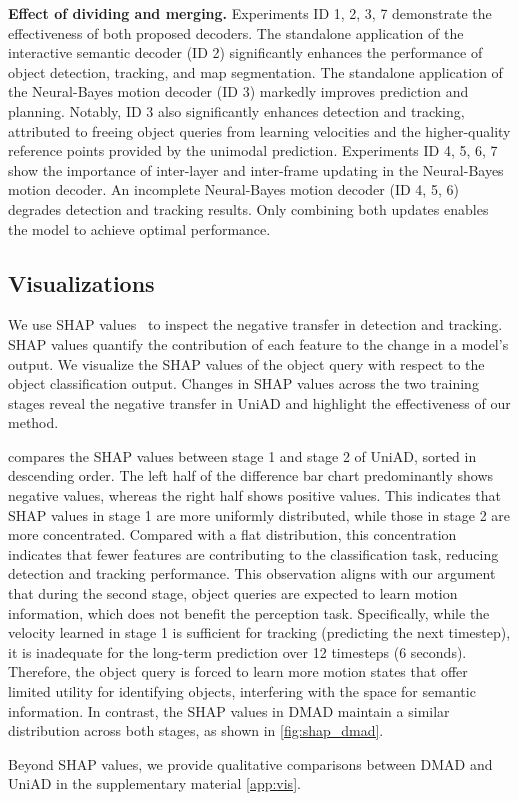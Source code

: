 \textbf{Effect of dividing and merging.} Experiments ID 1, 2, 3, 7 demonstrate the effectiveness of both proposed decoders. The standalone application of the interactive semantic decoder (ID 2) significantly enhances the performance of object detection, tracking, and map segmentation. The standalone application of the Neural-Bayes motion decoder (ID 3) markedly improves prediction and planning. Notably, ID 3 also significantly enhances detection and tracking, attributed to freeing object queries from learning velocities and the higher-quality reference points provided by the unimodal prediction. Experiments ID 4, 5, 6, 7 show the importance of inter-layer and inter-frame updating in the Neural-Bayes motion decoder. An incomplete Neural-Bayes motion decoder (ID 4, 5, 6) degrades detection and tracking results. Only combining both updates enables the model to achieve optimal performance.

\subsection{Visualizations}

We use SHAP values~\cite{NIPS2017_7062} to inspect the negative transfer in detection and tracking.
SHAP values quantify the contribution of each feature to the change in a model's output. %
We visualize the SHAP values of the object query with respect to the object classification output. Changes in SHAP values across the two training stages reveal the negative transfer in UniAD and highlight the effectiveness of our method.


 compares the SHAP values between stage 1 and stage 2 of UniAD, sorted in descending order. The left half of the difference bar chart predominantly shows negative values, whereas the right half shows positive values. This indicates that SHAP values in stage 1 are more uniformly distributed, while those in stage 2 are more concentrated. Compared with a flat distribution, this concentration indicates that fewer features are contributing to the classification task, reducing detection and tracking performance.
This observation aligns with our argument that during the second stage, object queries are expected to learn motion information, which does not benefit the perception task. 
Specifically, while the velocity learned in stage 1 is sufficient for tracking (predicting the next timestep), it is inadequate for the long-term prediction over 12 timesteps (6 seconds). 
Therefore, the object query is forced to learn more motion states that offer limited utility for identifying objects, interfering with the space for semantic information. 
In contrast, the SHAP values in DMAD maintain a similar distribution across both stages, as shown in \cref{fig:shap_dmad}.

Beyond SHAP values, we provide qualitative comparisons between DMAD and UniAD in the supplementary material \cref{app:vis}.
